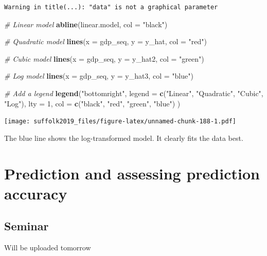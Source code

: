 \documentclass[]{article}
\newenvironment{Shaded}{\begin{snugshade}}{\end{snugshade}}
\newcommand{\CommentTok}[1]{\textcolor[rgb]{0.56,0.35,0.01}{\textit{#1}}}
\newcommand{\DataTypeTok}[1]{\textcolor[rgb]{0.13,0.29,0.53}{#1}}
\newcommand{\DecValTok}[1]{\textcolor[rgb]{0.00,0.00,0.81}{#1}}
\newcommand{\KeywordTok}[1]{\textcolor[rgb]{0.13,0.29,0.53}{\textbf{#1}}}
\newcommand{\NormalTok}[1]{#1}
\newcommand{\StringTok}[1]{\textcolor[rgb]{0.31,0.60,0.02}{#1}}
\begin{document}
\begin{verbatim}
Warning in title(...): "data" is not a graphical parameter
\end{verbatim}

\begin{Shaded}
\begin{Highlighting}[]
\CommentTok{# Linear model}
\KeywordTok{abline}\NormalTok{(linear.model, }\DataTypeTok{col =} \StringTok{"black"}\NormalTok{)}

\CommentTok{# Quadratic model}
\KeywordTok{lines}\NormalTok{(}\DataTypeTok{x =}\NormalTok{ gdp_seq, }\DataTypeTok{y =}\NormalTok{ y_hat, }\DataTypeTok{col =} \StringTok{"red"}\NormalTok{)}

\CommentTok{# Cubic model}
\KeywordTok{lines}\NormalTok{(}\DataTypeTok{x =}\NormalTok{ gdp_seq, }\DataTypeTok{y =}\NormalTok{ y_hat2, }\DataTypeTok{col =} \StringTok{"green"}\NormalTok{)}

\CommentTok{# Log model}
\KeywordTok{lines}\NormalTok{(}\DataTypeTok{x =}\NormalTok{ gdp_seq, }\DataTypeTok{y =}\NormalTok{ y_hat3, }\DataTypeTok{col =} \StringTok{"blue"}\NormalTok{)}

\CommentTok{# Add a legend}
\KeywordTok{legend}\NormalTok{(}\StringTok{"bottomright"}\NormalTok{, }
       \DataTypeTok{legend =} \KeywordTok{c}\NormalTok{(}\StringTok{"Linear"}\NormalTok{, }\StringTok{"Quadratic"}\NormalTok{, }\StringTok{"Cubic"}\NormalTok{, }\StringTok{"Log"}\NormalTok{), }
       \DataTypeTok{lty =} \DecValTok{1}\NormalTok{, }
       \DataTypeTok{col =} \KeywordTok{c}\NormalTok{(}\StringTok{"black"}\NormalTok{, }\StringTok{"red"}\NormalTok{, }\StringTok{"green"}\NormalTok{, }\StringTok{"blue"}\NormalTok{) }
\NormalTok{)}
\end{Highlighting}
\end{Shaded}

\texttt{[image: suffolk2019\_files/figure-latex/unnamed-chunk-188-1.pdf]}

The blue line shows the log-transformed model. It clearly fits the data best.

\hypertarget{prediction-and-assessing-prediction-accuracy}{%
\section{Prediction and assessing prediction accuracy}\label{prediction-and-assessing-prediction-accuracy}}

\hypertarget{seminar-8}{%
\subsection{Seminar}\label{seminar-8}}

Will be uploaded tomorrow
\end{document}

